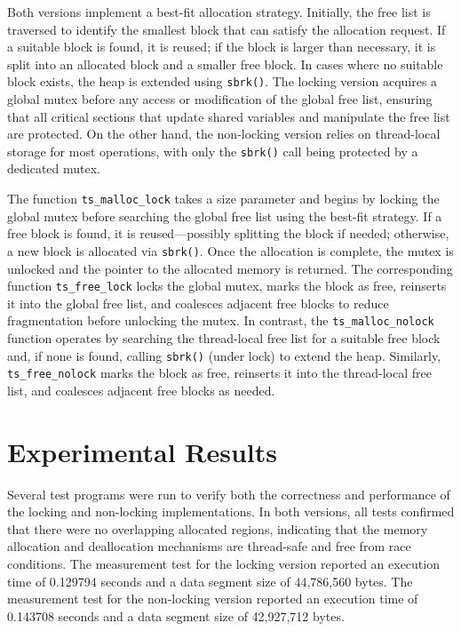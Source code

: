 \documentclass[12pt]{article}
\begin{document}
Both versions implement a best-fit allocation strategy. Initially, the free list is traversed to identify the smallest block that can satisfy the allocation request. If a suitable block is found, it is reused; if the block is larger than necessary, it is split into an allocated block and a smaller free block. In cases where no suitable block exists, the heap is extended using \texttt{sbrk()}. The locking version acquires a global mutex before any access or modification of the global free list, ensuring that all critical sections that update shared variables and manipulate the free list are protected. On the other hand, the non-locking version relies on thread-local storage for most operations, with only the \texttt{sbrk()} call being protected by a dedicated mutex.

The function \texttt{ts\_malloc\_lock} takes a size parameter and begins by locking the global mutex before searching the global free list using the best-fit strategy. If a free block is found, it is reused—possibly splitting the block if needed; otherwise, a new block is allocated via \texttt{sbrk()}. Once the allocation is complete, the mutex is unlocked and the pointer to the allocated memory is returned. The corresponding function \texttt{ts\_free\_lock} locks the global mutex, marks the block as free, reinserts it into the global free list, and coalesces adjacent free blocks to reduce fragmentation before unlocking the mutex. In contrast, the \texttt{ts\_malloc\_nolock} function operates by searching the thread-local free list for a suitable free block and, if none is found, calling \texttt{sbrk()} (under lock) to extend the heap. Similarly, \texttt{ts\_free\_nolock} marks the block as free, reinserts it into the thread-local free list, and coalesces adjacent free blocks as needed.

\section{Experimental Results}
Several test programs were run to verify both the correctness and performance of the locking and non-locking implementations. In both versions, all tests confirmed that there were no overlapping allocated regions, indicating that the memory allocation and deallocation mechanisms are thread-safe and free from race conditions. The measurement test for the locking version reported an execution time of 0.129794 seconds and a data segment size of 44,786,560 bytes. The measurement test for the non-locking version reported an execution time of 0.143708 seconds and a data segment size of 42,927,712 bytes.
\end{document}
